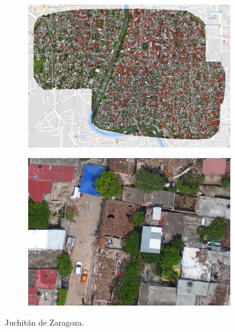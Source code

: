 \begin{figure}[!h]
  \centering
    \begin{subfigure}{.9\textwidth}
        \includegraphics[width=\textwidth]{images/juchitan-ortho.jpg}
    \end{subfigure}
    \begin{subfigure}{.9\textwidth}
        \includegraphics[width=\textwidth]{images/juchitan-example.jpg}
    \end{subfigure}
  \caption{Juchit\'an de Zaragoza.}
  \label{fig:juchitan}
\end{figure}

